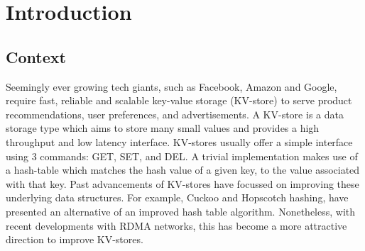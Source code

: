 

\chapter{Introduction}








\section{Context}
Seemingly ever growing tech giants, such as Facebook, Amazon and Google, require fast, reliable and scalable key-value storage (KV-store) to serve product recommendations, user preferences, and advertisements\cite{decandia2007dynamo,geambasu2010comet}.
A KV-store is a data storage type which aims to store many small values and provides a high throughput and low latency interface.
KV-stores usually offer a simple interface using 3 commands: GET, SET, and DEL.
A trivial implementation makes use of a hash-table which matches the hash value of a given key, to the value associated with that key.
Past advancements of KV-stores have focussed on improving these underlying data structures\cite{escriva2012hyperdex, lim2014mica}.
For example, Cuckoo and Hopscotch hashing\cite{kalia2014using, FaRM}, have presented an alternative of an improved hash table algorithm.
Nonetheless, with recent developments with RDMA networks, this has become a more attractive direction to improve KV-stores.


